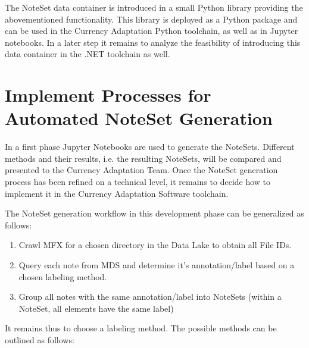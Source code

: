 The NoteSet data container is introduced in a small Python library providing the abovementioned functionality. This library is deployed as a Python package and can be used in the Currency Adaptation Python toolchain, as well as in Jupyter notebooks. In a later step it remains to analyze the feasibility of introducing this data container in the .NET toolchain as well.

\section{Implement Processes for Automated NoteSet Generation}
In a first phase Jupyter Notebooks are used to generate the NoteSets. Different methods and their results, i.e. the resulting NoteSets, will be compared and presented to the Currency Adaptation Team. Once the NoteSet generation process has been refined on a technical level, it remains to decide how to implement it in the Currency Adaptation Software toolchain.\par
The NoteSet generation workflow in this development phase can be generalized as follows: 
\begin{enumerate}
\item Crawl MFX for a chosen directory in the Data Lake to obtain all File IDs. 
\item Query each note from MDS and determine it's annotation/label based on a chosen labeling method. 
\item Group all notes with the same annotation/label into NoteSets (within a NoteSet, all elements have the same label)
\end{enumerate}
It remains thus to choose a labeling method. The possible methods can be outlined as follows:

